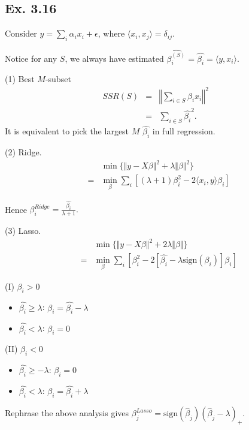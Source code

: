 \subsection*{Ex. 3.16}
Consider $y = \sum_{i} \alpha_i x_i + \epsilon$, where $\langle x_{i}, x_{j}\rangle=\delta_{ij}.$

Notice for any $S$, we always have estimated $\widehat{\beta_{i}^{(S)}} =\widehat{\beta_i}=\langle y, x_i\rangle$.

(1) Best $M$-subset
\begin{eqnarray*}
    SSR(S)&=&\left\Vert \sum_{i\in S}\widehat{\beta_{i}}x_{i}\right\Vert^2\\
    &=&\sum_{i\in S}\widehat{\beta_{i}}^2.
\end{eqnarray*}
It is equivalent to pick the largest $M$ $\widehat{\beta_{i}}$ in full regression.

(2) Ridge.
\begin{eqnarray*}
    &&\min\{\Vert y-X\beta\Vert^2 + \lambda \Vert \beta\Vert^2\}\\
    &=&\min_{\beta}\sum_{i}[(\lambda + 1)\beta_{i}^2 - 2\langle x_{i}, y\rangle\beta_{i}]
\end{eqnarray*}

Hence $\beta_{i}^{Ridge}=\frac{\widehat{\beta_i}}{\lambda + 1}.$


(3) Lasso.
\begin{eqnarray*}
    &&\min\{\Vert y-X\beta\Vert^2 + 2 \lambda \Vert \beta\Vert\}\\
    &=&\min_{\beta}\sum_{i}\left[\beta_{i}^2 - 2[\hat{\beta_{i}} - \lambda \mbox{sign}(\beta_i)]\beta_{i}\right]
\end{eqnarray*}

(I) $\beta_{i} > 0$
\begin{itemize}
    \item $\hat{\beta_{i}} \geq \lambda$: $\beta_{i} = \hat{\beta_{i}} - \lambda$
    \item $\hat{\beta_{i}} < \lambda$: $\beta_{i} = 0$
\end{itemize}

(II) $\beta_{i} < 0$
\begin{itemize}
    \item $\hat{\beta_{i}} \geq -\lambda$: $\beta_{i} = 0$
    \item $\hat{\beta_{i}} < \lambda$: $\beta_{i} = \hat{\beta_{i}} + \lambda$
\end{itemize}
Rephrase the above analysis gives $\beta^{Lasso}_{j} = \mbox{sign}(\hat{\beta}_{j})(\hat{\beta}_{j} - \lambda)_+$.


